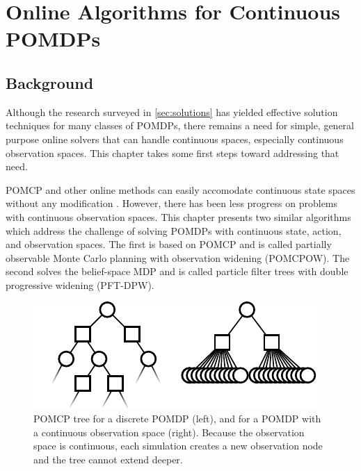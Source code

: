 \chapter{Online Algorithms for Continuous POMDPs} \label{chap:pomcpow}

\section{Background}

Although the research surveyed in \cref{sec:solutions} has yielded effective solution techniques for many classes of POMDPs, there remains a need for simple, general purpose online solvers that can handle continuous spaces, especially continuous observation spaces.
This chapter takes some first steps toward addressing that need.

POMCP and other online methods can easily accomodate continuous state spaces without any modification \cite{goldhoorn2014continuous}.
However, there has been less progress on problems with continuous observation spaces.
This chapter presents two similar algorithms which address the challenge of solving POMDPs with continuous state, action, and observation spaces.
The first is based on POMCP and is called partially observable Monte Carlo planning with observation widening (POMCPOW). 
The second solves the belief-space MDP and is called particle filter trees with double progressive widening (PFT-DPW).

\begin{figure}[htb]
\begin{center}
    \includegraphics[width=0.9\columnwidth]{media/continuous_tree.pdf}
\end{center}
\caption[POMCP tree on a continuous observation space]{POMCP tree for a discrete POMDP (left), and for a POMDP with a continuous observation space (right). Because the observation space is continuous, each simulation creates a new observation node and the tree cannot extend deeper.}
\label{fig:ctree}
\end{figure}

